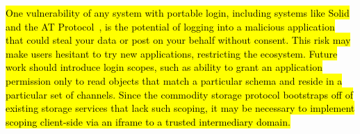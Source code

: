 \hl{%
One vulnerability of any system with portable login,
including systems like Solid and the AT Protocol~{\cite{bluesky}},
is the potential of logging into
a malicious application that could steal your data or
post on your behalf without consent.
This risk may make users hesitant to try new applications,
restricting the ecosystem.
Future work should introduce login scopes, such as
ability to grant an application permission only to read objects
that match a particular schema and reside in a particular set of channels.
Since the commodity storage protocol bootstraps off of
existing storage services that lack such scoping,
it may be necessary to implement scoping client-side
via an iframe to a trusted intermediary domain.
}%



